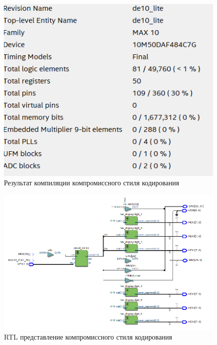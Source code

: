 \documentclass[a4paper,14pt]{article}
\begin{document}
	\begin{figure}[H]
		\centering
		\includegraphics[width=0.5\linewidth]{images/9_3_compilation}
		\caption{Результат компиляции компромиссного стиля кодирования}
		\label{fig:9_3_compilation}
	\end{figure}

	\begin{figure}[H]
		\centering
		\includegraphics[width=0.9\linewidth]{images/9_3_rtl}
		\caption{RTL представление компромиссного стиля кодирования}
		\label{fig:9_3_rtl}
	\end{figure}
\end{document}

